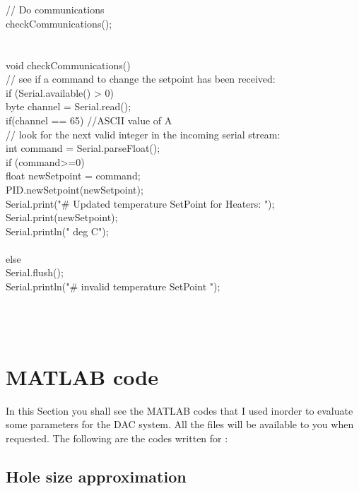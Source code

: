 \begin{appendices}
{{    \\
\\
    // Do communications \\
    checkCommunications(); \\
} \\
\\
void checkCommunications(){ \\
    // see if a command to change the setpoint has been received: \\
    if (Serial.available() > 0){ \\
            byte channel = Serial.read(); \\
            if(channel == 65){          //ASCII value of A \\
            // look for the next valid integer in the incoming serial stream: \\
            int command = Serial.parseFloat(); \\
                if (command>=0){ \\
                float newSetpoint = command; \\
                PID.newSetpoint(newSetpoint); \\
                Serial.print("\# Updated temperature SetPoint for Heaters: "); \\
                Serial.print(newSetpoint); \\
                Serial.println(" deg C"); \\
                } \\
            else{ \\
                Serial.flush(); \\
                Serial.println("\# invalid temperature SetPoint "); \\
                } \\
            } \\
    } \\
}  
}


\newpage
\section{MATLAB code}
\label{ap:MATLAB}

In this Section you shall see the MATLAB codes that I used inorder to evaluate some parameters for the DAC system. All the files will be available to you when requested. The following are the codes written for :

    \subsection{Hole size approximation}
    \label{sec:holesize}


\end{appendices}
